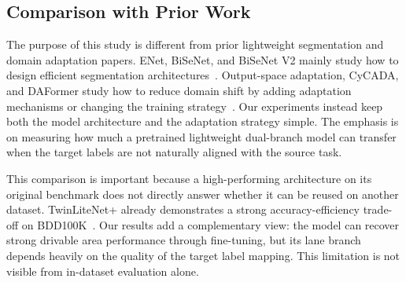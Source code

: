 \documentclass[conference]{IEEEtran}
\begin{document}
\subsection{Comparison with Prior Work}
The purpose of this study is different from prior lightweight segmentation and domain adaptation papers. ENet, BiSeNet, and BiSeNet V2 mainly study how to design efficient segmentation architectures~\cite{ref5,ref6,ref7}. Output-space adaptation, CyCADA, and DAFormer study how to reduce domain shift by adding adaptation mechanisms or changing the training strategy~\cite{ref8,ref9,ref10}. Our experiments instead keep both the model architecture and the adaptation strategy simple. The emphasis is on measuring how much a pretrained lightweight dual-branch model can transfer when the target labels are not naturally aligned with the source task.

This comparison is important because a high-performing architecture on its original benchmark does not directly answer whether it can be reused on another dataset. TwinLiteNet+ already demonstrates a strong accuracy-efficiency trade-off on BDD100K~\cite{ref1}. Our results add a complementary view: the model can recover strong drivable area performance through fine-tuning, but its lane branch depends heavily on the quality of the target label mapping. This limitation is not visible from in-dataset evaluation alone.


\begin{table}[!t]
\centering
\caption{Conceptual comparison with representative prior work.}
\label{tab:prior_comparison}
\end{table}
\end{document}
